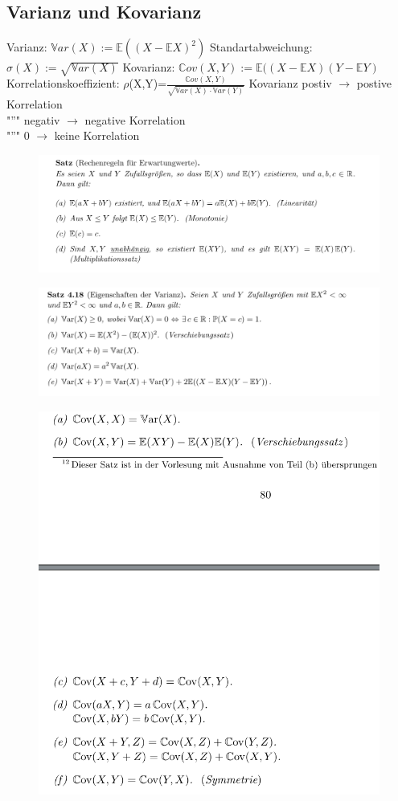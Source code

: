 \documentclass[]{article}
\begin{document}
\subsection{Varianz und Kovarianz}
Varianz: $\mathbb{V}ar(X):=\mathbb{E}((X-\mathbb{E}X)^2)$
Standartabweichung: $\sigma(X):=\sqrt{\mathbb{V}ar(X)}$
Kovarianz: $\mathbb{C}ov(X,Y):=\mathbb{E}((X-\mathbb{E}X)(Y-\mathbb{E}Y)$\\
Korrelationskoeffizient: $\rho$(X,Y)=$\frac{\mathbb{C}ov(X,Y)}{\sqrt{\mathbb{V}ar(X) \cdot \mathbb{V}ar(Y)}}$
Kovarianz postiv $\rightarrow$ postive Korrelation \\
"''" negativ $\rightarrow$ negative Korrelation \\
"''" 0 $\rightarrow$ keine Korrelation
\newpage
\begin{figure}
	\centering
	\includegraphics[width=1.0\linewidth]{Rechenregelnerwartungswert}
	\label{fig:rechenregelnerwartungswert}
\end{figure}
\begin{figure}
	\centering
	\includegraphics[width=1.0\linewidth]{Rechenregelnvarianz}
	\label{fig:rechenregelnvarianz}
\end{figure}
\begin{figure}
	\centering
	\includegraphics[width=0.5\linewidth]{Rechenregelncovarianz}
	\label{fig:rechenregelncovarianz}
\end{figure}
\end{document}
